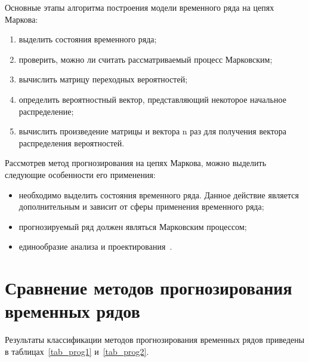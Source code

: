 Основные этапы алгоритма построения модели временного ряда на цепях Маркова:
\begin{enumerate}
    \item выделить состояния временного ряда;
    \item проверить, можно ли считать рассматриваемый процесс Марковским;
    \item вычислить матрицу переходных вероятностей;
    \item определить вероятностный вектор, представляющий некоторое начальное распределение;
    \item вычислить произведение матрицы и вектора n раз для получения вектора распределения вероятностей.
\end{enumerate}

Рассмотрев метод прогнозирования на цепях Маркова, можно выделить следующие особенности его применения:
\begin{itemize}
    \item необходимо выделить состояния временного ряда.
    Данное действие является дополнительным и зависит от сферы применения временного ряда;
    \item прогнозируемый ряд должен являться Марковским процессом;
    \item единообразие анализа и проектирования~\cite{myref9}.
\end{itemize}

\section{Сравнение методов прогнозирования временных рядов}

Результаты классификации методов прогнозирования временных рядов приведены в таблицах~\ref{tab_prog1} и~\ref{tab_prog2}.

